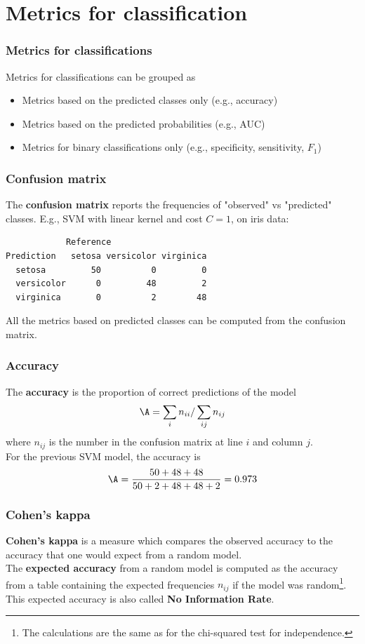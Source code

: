 \section{Metrics for classification}
\begin{frame}
\frametitle{Metrics for classifications}
Metrics for classifications can be grouped as
\begin{itemize}
\item Metrics based on the predicted classes only (e.g., accuracy)
\item Metrics based on the predicted probabilities (e.g., AUC)
\item Metrics for binary classifications only (e.g., specificity, sensitivity, $F_1$)
\end{itemize}
\end{frame}
\begin{frame}[fragile]
\frametitle{Confusion matrix}
The {\bf confusion matrix} reports the frequencies of "observed" vs "predicted" classes. E.g., SVM with linear kernel and cost $C=1$, on iris data:\\
\scriptsize
\begin{verbatim}
            Reference
Prediction   setosa versicolor virginica
  setosa         50          0         0
  versicolor      0         48         2
  virginica       0          2        48
\end{verbatim}
\normalsize
All the metrics based on predicted classes can be computed from the confusion matrix. 
\end{frame}
\begin{frame}
\frametitle{Accuracy}
The {\bf accuracy} is the proportion of correct predictions of the model
$$
\A = \sum_i n_{ii}/\sum_{ij} n_{ij} 
$$
where $n_{ij}$ is the number in the confusion matrix at line $i$ and column $j$.\\
\vspace{0.3cm}
For the previous SVM model, the accuracy is
$$
\A = \frac{50+48+48}{50+2+48+48+2} = 0.973
$$
\end{frame}
\begin{frame}
\frametitle{Cohen's kappa}
{\bf Cohen's kappa} is a measure which compares the observed accuracy to the accuracy that one would expect from a random model.\\ 
\vspace{0.2cm}
The {\bf expected accuracy} from a random model is computed as the accuracy from a table containing the expected frequencies $n_{ij}$ if the model was random\footnote{The calculations are the same as for the chi-squared test for independence.}.\\ 
\vspace{0.3cm}
This expected accuracy is also called {\bf No Information Rate}.
\end{frame}
